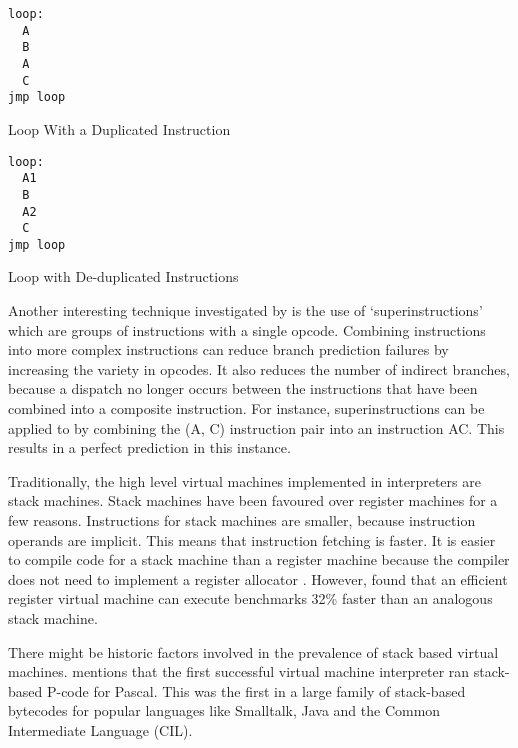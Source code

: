 		\begin{doublefig}
			\begin{halffig}
				\begin{lstlisting}
loop:
  A
  B
  A
  C
jmp loop
  				\end{lstlisting}
				\caption{Loop With a Duplicated Instruction}
				\label{fig:duplicatedinstructions}
			\end{halffig}
			\begin{halffig}
				\begin{lstlisting}
loop:
  A1
  B
  A2
  C
jmp loop
				\end{lstlisting}
				\caption{Loop with De-duplicated Instructions}
				\label{fig:deduplicatedinstructions}
			\end{halffig}
		\end{doublefig}
		
		
		
		Another interesting technique investigated by \citeauthor{optimizingindirectbranch} is the use of `superinstructions' which are groups of instructions with a single opcode. Combining instructions into more complex instructions can reduce branch prediction failures by increasing the variety in opcodes. It also reduces the number of indirect branches, because a dispatch no longer occurs between the instructions that have been combined into a composite instruction. For instance, superinstructions can be applied to  by combining the (A, C) instruction pair into an instruction AC. This results in a perfect prediction in this instance.
		
		Traditionally, the high level virtual machines implemented in interpreters are stack machines. Stack machines have been favoured over register machines for a few reasons. Instructions for stack machines are smaller, because instruction operands are implicit. This means that instruction fetching is faster. It is easier to compile code for a stack machine than a register machine because the compiler does not need to implement a register allocator \citep{caseregistervm}. However, \cite{stackregistershowdown} found that an efficient register virtual machine can execute benchmarks 32\% faster than an analogous stack machine. 
		
		There might be historic factors involved in the prevalence of stack based virtual machines. \cite{caseregistervm} mentions that the first successful virtual machine interpreter ran stack-based P-code for Pascal. This was the first in a large family of stack-based bytecodes for popular languages like Smalltalk, Java and the Common Intermediate Language (CIL).
		
